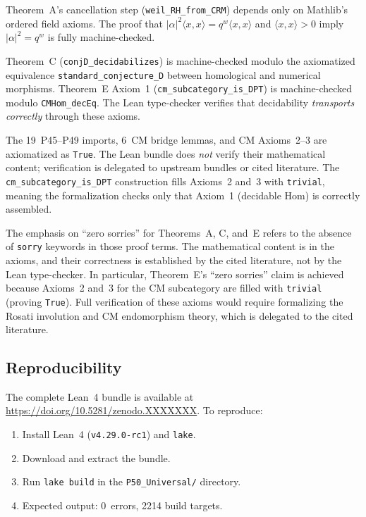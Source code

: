 \documentclass[11pt]{article}
\theoremstyle{definition}
\theoremstyle{remark}
\newcommand{\leanRepo}{\url{https://doi.org/10.5281/zenodo.XXXXXXX}}
\newcommand{\ip}[2]{\langle #1, #2 \rangle}
\begin{document}
\begin{description}[leftmargin=2em]
\item[(a) Verified with no custom axioms.] Theorem~A's cancellation step (\texttt{weil\_RH\_from\_CRM}) depends only on Mathlib's ordered field axioms. The proof that $|\alpha|^2 \ip{x}{x} = q^w \ip{x}{x}$ and $\ip{x}{x} > 0$ imply $|\alpha|^2 = q^w$ is fully machine-checked.

\item[(b) Verified modulo named mathematical axioms.] Theorem~C (\texttt{conjD\_decidabilizes}) is machine-checked modulo the axiomatized equivalence \texttt{standard\_conjecture\_D} between homological and numerical morphisms. Theorem~E Axiom~1 (\texttt{cm\_subcategory\_is\_DPT}) is machine-checked modulo \texttt{CMHom\_decEq}. The Lean type-checker verifies that decidability \emph{transports correctly} through these axioms.

\item[(c) Axiomatized content (\texttt{True}-valued).] The 19~P45--P49 imports, 6~CM bridge lemmas, and CM Axioms~2--3 are axiomatized as \texttt{True}. The Lean bundle does \emph{not} verify their mathematical content; verification is delegated to upstream bundles or cited literature. The \texttt{cm\_subcategory\_is\_DPT} construction fills Axioms~2 and~3 with \texttt{trivial}, meaning the formalization checks only that Axiom~1 (decidable Hom) is correctly assembled.
\end{description}

\noindent The emphasis on ``zero sorries'' for Theorems~A, C, and~E refers to the absence of \texttt{sorry} keywords in those proof terms. The mathematical content is in the axioms, and their correctness is established by the cited literature, not by the Lean type-checker. In particular, Theorem~E's ``zero sorries'' claim is achieved because Axioms~2 and~3 for the CM subcategory are filled with \texttt{trivial} (proving \texttt{True}). Full verification of these axioms would require formalizing the Rosati involution and CM endomorphism theory, which is delegated to the cited literature.

\subsection{Reproducibility}

The complete Lean~4 bundle is available at \leanRepo. To reproduce:

\begin{enumerate}
\item Install Lean~4 (\texttt{v4.29.0-rc1}) and \texttt{lake}.
\item Download and extract the bundle.
\item Run \texttt{lake build} in the \texttt{P50\_Universal/} directory.
\item Expected output: 0~errors, 2214 build targets.
\end{enumerate}
\end{document}
